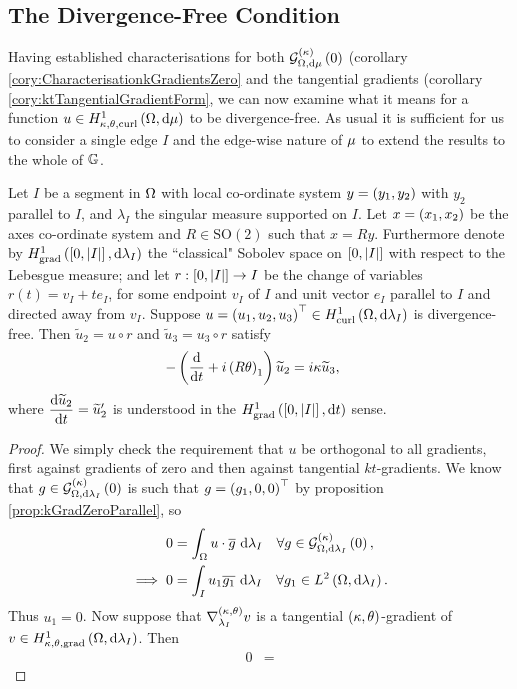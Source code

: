 \subsection{The Divergence-Free Condition} \label{sec:ktDivFree}
Having established characterisations for both $\mathcal{G}_{ \Omega, \mathrm{d}\mu}^{(\kappa)}\left( 0 \right)$ (corollary \ref{cory:CharacterisationkGradientsZero} and the tangential gradients (corollary \ref{cory:ktTangentialGradientForm}, we can now examine what it means for a function $u\in H^1_{\kappa,\theta,\mathrm{curl}}\left( \Omega, \mathrm{d}\mu \right)$ to be divergence-free.
As usual it is sufficient for us to consider a single edge $I$ and the edge-wise nature of $\mu$ to extend the results to the whole of $\mathbb{G}$.
\begin{prop}
	Let $I$ be a segment in $\Omega$ with local co-ordinate system $y=\left( y_1,y_2 \right)$ with $y_2$ parallel to $I$, and $\lambda_I$ the singular measure supported on $I$.
	Let $x=\left( x_1,x_2 \right)$ be the axes co-ordinate system and $R\in\mathrm{SO}(2)$ such that $x=Ry$.
	Furthermore denote by $H^1_\mathrm{grad}\left( \left[ 0,\left\lvert I \right\rvert \right], \mathrm{d}\lambda_I \right)$ the ``classical" Sobolev space on $\left[ 0,\left\lvert I \right\rvert \right]$ with respect to the Lebesgue measure; and let $r:\left[ 0,\left\lvert I \right\rvert \right]\rightarrow I$ be the change of variables $r(t)= v_I + t e_I$, for some endpoint $v_I$ of $I$ and unit vector $e_I$ parallel to $I$ and directed away from $v_I$.
	Suppose $u=\left( u_1, u_2, u_3 \right)^\top\in H^1_\mathrm{curl}\left( \Omega, \mathrm{d}\lambda_I \right)$ is divergence-free.
	Then $\widetilde{u}_2 = u \circ r$ and $\widetilde{u}_3 = u_3 \circ r$ satisfy
	\begin{align*}
		-\left( \dfrac{\mathrm{d}}{\mathrm{d}t} + i\left( R\theta \right)_1 \right)\widetilde{u}_2 &= i\kappa\widetilde{u}_3,
	\end{align*}
	where $\dfrac{\mathrm{d}\widetilde{u}_2}{\mathrm{d}t} = \widetilde{u}'_2$ is understood in the $H^1_\mathrm{grad}\left( \left[ 0,\left\lvert I \right\rvert \right], \mathrm{d}t \right)$ sense.
\end{prop}
\begin{proof}
	We simply check the requirement that $u$ be orthogonal to all gradients, first against gradients of zero and then against tangential $kt$-gradients.
	We know that $g\in\mathcal{G}_{ \Omega, \mathrm{d}\lambda_I}^{(\kappa)}\left( 0 \right)$ is such that $g=\left( g_1,0,0 \right)^\top$ by proposition \ref{prop:kGradZeroParallel}, so
	\begin{align*}
		0 &= \int_{\Omega} u\cdot\overline{g}  \ \mathrm{d}\lambda_I \quad\forall g\in\mathcal{G}_{ \Omega, \mathrm{d}\lambda_I}^{(\kappa)}\left( 0 \right), \\
		\implies 0 &= \int_{I} u_1 \overline{g_1}  \ \mathrm{d}\lambda_I \quad \forall g_1\in L^{2}\left( \Omega,\mathrm{d}\lambda_I \right).
	\end{align*}
	Thus $u_1 = 0$.
	Now suppose that $\nabla^{\left( \kappa, \theta \right)}_{\lambda_I} v$ is a tangential $\left( \kappa, \theta \right)$-gradient of $v\in H^1_{\kappa,\theta,\mathrm{grad}}\left( \Omega, \mathrm{d}\lambda_I \right)$.
	Then
	\begin{align*}
		0 &= 
	\end{align*}
\end{proof}

